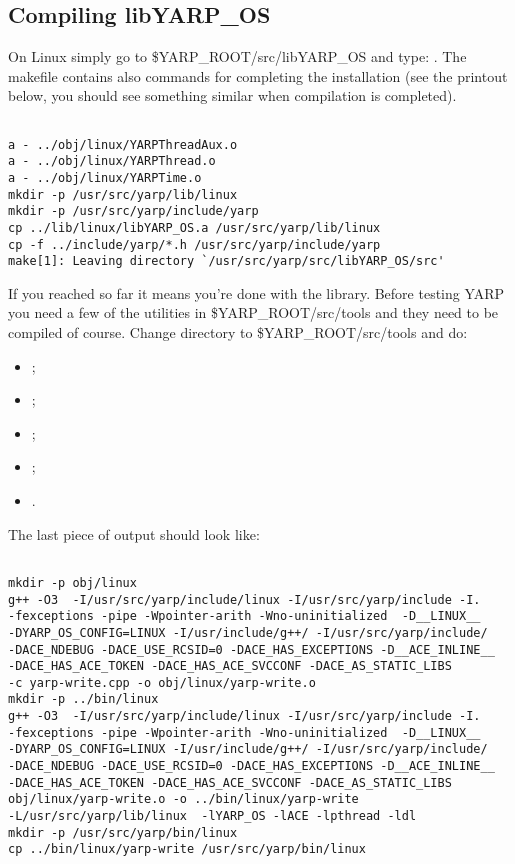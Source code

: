 \subsection{Compiling libYARP\_OS}

On Linux simply go to \$YARP\_ROOT/src/libYARP\_OS and type: . The makefile contains also commands for completing the installation (see the printout below, you should see something similar when compilation is completed). 

\begin{verbatim}

a - ../obj/linux/YARPThreadAux.o
a - ../obj/linux/YARPThread.o
a - ../obj/linux/YARPTime.o
mkdir -p /usr/src/yarp/lib/linux
mkdir -p /usr/src/yarp/include/yarp
cp ../lib/linux/libYARP_OS.a /usr/src/yarp/lib/linux
cp -f ../include/yarp/*.h /usr/src/yarp/include/yarp
make[1]: Leaving directory `/usr/src/yarp/src/libYARP_OS/src'

\end{verbatim}

If you reached so far it means you're done with the library. Before testing YARP you need a few of the utilities in \$YARP\_ROOT/src/tools and they need to be compiled of course. Change directory to \$YARP\_ROOT/src/tools and do:
\begin{itemize}
\item {};
\item {};
\item {};
\item {};
\item {}.
\end{itemize}

The last piece of output should look like:
\begin{verbatim}

mkdir -p obj/linux
g++ -O3  -I/usr/src/yarp/include/linux -I/usr/src/yarp/include -I.  
-fexceptions -pipe -Wpointer-arith -Wno-uninitialized  -D__LINUX__ 
-DYARP_OS_CONFIG=LINUX -I/usr/include/g++/ -I/usr/src/yarp/include/ 
-DACE_NDEBUG -DACE_USE_RCSID=0 -DACE_HAS_EXCEPTIONS -D__ACE_INLINE__ 
-DACE_HAS_ACE_TOKEN -DACE_HAS_ACE_SVCCONF -DACE_AS_STATIC_LIBS   
-c yarp-write.cpp -o obj/linux/yarp-write.o
mkdir -p ../bin/linux
g++ -O3  -I/usr/src/yarp/include/linux -I/usr/src/yarp/include -I.  
-fexceptions -pipe -Wpointer-arith -Wno-uninitialized  -D__LINUX__ 
-DYARP_OS_CONFIG=LINUX -I/usr/include/g++/ -I/usr/src/yarp/include/ 
-DACE_NDEBUG -DACE_USE_RCSID=0 -DACE_HAS_EXCEPTIONS -D__ACE_INLINE__ 
-DACE_HAS_ACE_TOKEN -DACE_HAS_ACE_SVCCONF -DACE_AS_STATIC_LIBS   
obj/linux/yarp-write.o -o ../bin/linux/yarp-write 
-L/usr/src/yarp/lib/linux  -lYARP_OS -lACE -lpthread -ldl
mkdir -p /usr/src/yarp/bin/linux
cp ../bin/linux/yarp-write /usr/src/yarp/bin/linux

\end{verbatim}

